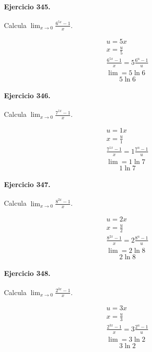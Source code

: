 \documentclass[11pt,a4paper]{article}
\begin{document}
\paragraph{Ejercicio 345.} Calcula $\displaystyle\lim_{x\to0}\frac{6^{5x}-1}{x}$.

\[
\begin{aligned}
u=5x\\
x=\frac{u}{5}\\
\frac{6^{5x}-1}{x}=5\frac{6^u-1}{u}\\
\lim=5\ln 6
\end{aligned}
\]
\[\boxed{5\ln 6}\]


\paragraph{Ejercicio 346.} Calcula $\displaystyle\lim_{x\to0}\frac{7^{1x}-1}{x}$.

\[
\begin{aligned}
u=1x\\
x=\frac{u}{1}\\
\frac{7^{1x}-1}{x}=1\frac{7^u-1}{u}\\
\lim=1\ln 7
\end{aligned}
\]
\[\boxed{1\ln 7}\]


\paragraph{Ejercicio 347.} Calcula $\displaystyle\lim_{x\to0}\frac{8^{2x}-1}{x}$.

\[
\begin{aligned}
u=2x\\
x=\frac{u}{2}\\
\frac{8^{2x}-1}{x}=2\frac{8^u-1}{u}\\
\lim=2\ln 8
\end{aligned}
\]
\[\boxed{2\ln 8}\]


\paragraph{Ejercicio 348.} Calcula $\displaystyle\lim_{x\to0}\frac{2^{3x}-1}{x}$.

\[
\begin{aligned}
u=3x\\
x=\frac{u}{3}\\
\frac{2^{3x}-1}{x}=3\frac{2^u-1}{u}\\
\lim=3\ln 2
\end{aligned}
\]
\[\boxed{3\ln 2}\]
\end{document}
